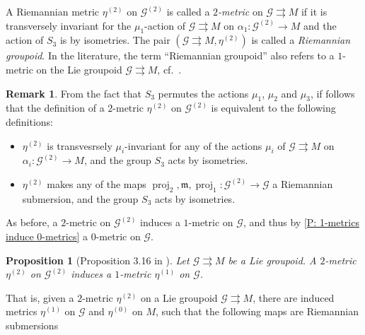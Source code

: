 \documentclass[12pt,a4paper,reqno]{amsart}
\DeclareMathOperator{\proj}{proj} %
\newcommand{\1}{\mathbbm{1}} %
\newcommand{\G}{\mathcal{G}} %
\newcommand{\m}{\mathfrak{m}} %
\newtheorem{proposition}[thm]{Proposition}
\theoremstyle{definition}
\newtheorem{remark}[thm]{Remark}
\theoremstyle{TheoremNum}
\begin{document}
A Riemannian metric $\eta^{(2)}$ on $\G^{(2)}$ is called a \emph{$2$-metric} on $\G\rightrightarrows M$ if it is transversely invariant for the $\mu_1$-action of  $\G\rightrightarrows M$ on $\alpha_1\colon \G^{(2)}\to M$ and the action of $S_3$ is by isometries. The pair $(\G\rightrightarrows M, \eta^{(2)})$ is called a \emph{Riemannian groupoid}. In the literature, the term ``Riemannian groupoid'' also refers to a $1$-metric on the Lie groupoid $\G\rightrightarrows M$, cf.\ \cite{GallegoGualdraniHectorReventos1989,Glickenstein2008}.

\begin{remark}
From the fact that $S_3$ permutes the actions $\mu_1$, $\mu_2$ and $\mu_3$, if follows that the definition of a $2$-metric $\eta^{(2)}$ on $\G^{(2)}$ is equivalent to the following definitions:
\begin{itemize}[itemsep = 0.5em]
\item $\eta^{(2)}$ is transvesrsely $\mu_i$-invariant for any of the actions $\mu_i$ of $\G\rightrightarrows M$ on $\alpha_i\colon \G^{(2)}\to M$, and the group $S_3$ acts by isometries.
\item $\eta^{(2)}$ makes any of the maps $\proj_2,\m,\proj_1\colon \G^{(2)}\to \G$ a Riemannian submersion, and the group $S_3$ acts by isometries.
\end{itemize}
\end{remark}

As before, a $2$-metric on $\G^{(2)}$ induces a $1$-metric on $\G$, and thus by \th\ref{P: 1-metrics induce 0-metrics} a $0$-metric on $\G$.

\begin{proposition}[Proposition 3.16 in \cite{delHoyoFernandes2018}]\th\label{P: 2-metrics induce 1-metrics}
Let $\G \rightrightarrows M$ be a Lie groupoid. A $2$-metric $\eta^{(2)}$ on $\G^{(2)}$ induces a $1$-metric $\eta^{(1)}$ on $\G$.
\end{proposition}

That is, given a $2$-metric $\eta^{(2)}$ on a Lie groupoid $\G\rightrightarrows M$, there are induced metrics $\eta^{(1)}$ on $\G$ and $\eta^{(0)}$ on $M$, such that the following maps are Riemannian submersions
\begin{center}
\end{center}
\end{document}
